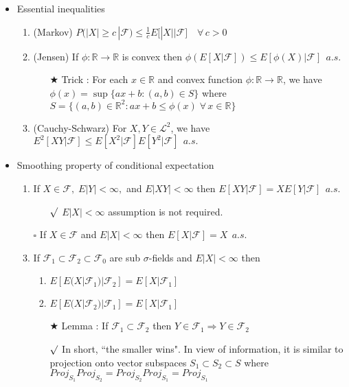 \documentclass[12pt, A4]{article}
\newcommand{\sq}{$\square$}
\newcommand{\rmk}{$\surd$}
\newcommand{\trick}{$\bigstar$}
\newcommand{\R}{\mathbb{R}}
\newcommand{\F}{\mathcal{F}}
\newcommand{\LL}{\mathcal{L}}
\begin{document}
\begin{itemize}
\begin{itemize}
	\end{itemize}
	\item Essential inequalities
	\begin{enumerate}
		\item (Markov) \; $P(|X|\geq c\,  | \F)\leq \frac{1}{c}E\big[|X| \big| \F \big]\quad \forall \, c>0$
		\item (Jensen) \; If $\phi : \R\rightarrow \R$ is convex then $\phi(E[X|\F])\leq E[\phi(X)|\F]\;\, a.s.$
		\begin{itemize}
			\item[\trick] Trick : For each $x\in \R$ and convex function $\phi:\R\rightarrow \R$, we have \\ $\phi(x)=\sup\{ax+b : (a,b)\in S\}$ where $S=\{(a,b)\in \R^2 : ax+b\leq \phi(x)\;\forall\,x\in \R\}$ 
		\end{itemize}
		\item (Cauchy-Schwarz) For $X, Y\in \LL^2$, we have $E^2[XY|\F]\leq E[X^2|\F]E[Y^2|\F]\;\, a.s.$
	\end{enumerate}
	\item Smoothing property of conditional expectation
	\begin{enumerate}
		\item If $X\in \F, \; E|Y|<\infty, $ and $E|XY|<\infty$ then $E[XY|\F]=XE[Y|\F]\;\,a.s.$
		\begin{itemize}
			\item[\rmk] $E|X|<\infty$ assumption is not required.
		\end{itemize}
		\item[\sq] If $X\in \F$ and $E|X|<\infty$ then $E[X|\F]=X\;\,a.s.$ 
		\item If $\F_1\subset \F_2\subset \F_0$ are sub $\sigma$-fields and $E|X|<\infty$ then 
		\begin{enumerate}
			\item $E[E(X|\F_1)|\F_2]=E[X|\F_1]$
			\item $E[E(X|\F_2)|\F_1]=E[X|\F_1]$
		\end{enumerate}
		\begin{itemize}
			\item[\trick] Lemma :  If $\F_1\subset \F_2$ then $Y\in \F_1\Rightarrow Y\in \F_2$
			\item[\rmk] In short, ``the smaller wins". In view of information, it is similar to projection onto vector subspaces $S_1\subset S_2\subset S$ where $Proj_{S_1}Proj_{S_2}=Proj_{S_2}Proj_{S_1}=Proj_{S_1}$
		\end{itemize}
	\end{enumerate}

\end{itemize}
\end{document}
